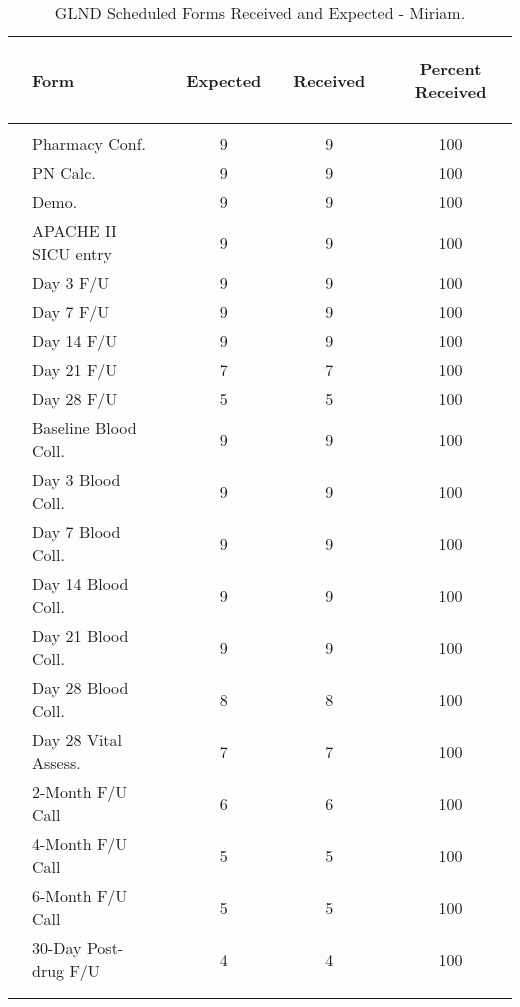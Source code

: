 \documentclass[dvips,10pt]{article}
\begin{document}
\clearpage
\begin{table}[t]
\caption
{ GLND Scheduled Forms Received and Expected - Miriam. }
\begin{center}
\begin{tabular}{ @{}l@{}
@{}l@{}@{}p{1.5em}@{}@{}c@{}@{}p{1.5em}@{}@{}c@{}@{}p{1.5em}@{}@{}c@{}
}
\hline

& \parbox{6em}{\begin{center}Form\end{center}} && \parbox{6em}{\begin{center}Expected\end{center}} && \parbox{6em}{\begin{center}Received\end{center}} && \parbox{6em}{\begin{center}Percent Received\end{center}} \\

\hline

\\
& Pharmacy Conf. && 9 && 9 && 100 \\
& PN Calc. && 9 && 9 && 100 \\
& Demo. && 9 && 9 && 100 \\
& APACHE II SICU entry && 9 && 9 && 100 \\
& Day 3 F/U && 9 && 9 && 100 \\
& Day 7 F/U && 9 && 9 && 100 \\
& Day 14 F/U && 9 && 9 && 100 \\
& Day 21 F/U && 7 && 7 && 100 \\
& Day 28 F/U && 5 && 5 && 100 \\
& Baseline Blood Coll. && 9 && 9 && 100 \\
& Day 3 Blood Coll. && 9 && 9 && 100 \\
& Day 7 Blood Coll. && 9 && 9 && 100 \\
& Day 14 Blood Coll. && 9 && 9 && 100 \\
& Day 21 Blood Coll. && 9 && 9 && 100 \\
& Day 28 Blood Coll. && 8 && 8 && 100 \\
& Day 28 Vital Assess. && 7 && 7 && 100 \\
& 2-Month F/U Call && 6 && 6 && 100 \\
& 4-Month F/U Call && 5 && 5 && 100 \\
& 6-Month F/U Call && 5 && 5 && 100 \\
& 30-Day Post-drug F/U && 4 && 4 && 100 \\
\\
\hline \\

\end{tabular}

\end{center}
 \end{table}
\end{document}

